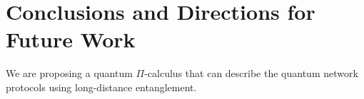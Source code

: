 \documentclass[a4paper,UKenglish,cleveref, autoref, thm-restate]{lipics-v2021}
\begin{document}











\section{Conclusions and Directions for Future Work} \label{sec:conclusions}

We are proposing a quantum $\Pi$-calculus that can describe the quantum network protocols using long-distance entanglement. 



\end{document}
